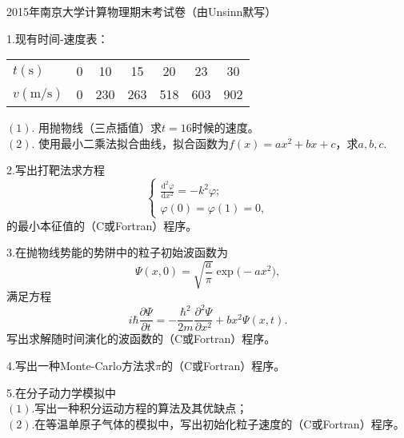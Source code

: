 \documentclass[10pt]{extarticle}
\begin{document}
\begin{center}
	2015年南京大学计算物理期末考试卷（由Unsinn默写）
\end{center}

\noindent 1.现有时间-速度表：

\begin{table}[h]
\centering
\begin{tabular}{l c c c c c c}
\hline
$t(\mathrm{s})$ & 0 & 10 & 15 &20 &23 &30\\
$v(\mathrm{m/s})$ & 0 & 230 & 263 & 518 &603 &902\\
\hline
\end{tabular}
\end{table}
\noindent $(1)$. 用抛物线（三点插值）求$t=16$时候的速度。\\
$(2)$. 使用最小二乘法拟合曲线，拟合函数为$f(x)=ax^2+bx+c$，求$a,b,c$.

\vspace{10ex}

\noindent 2.写出打靶法求方程
\[
	\begin{cases}
		\displaystyle{\frac{\mathrm{d}^2\varphi}{\mathrm{d}x^2}=-k^2 \varphi};\\
		\varphi(0)=\varphi(1)=0,
	\end{cases}
\]
的最小本征值的（C或Fortran）程序。

\vspace{10ex}

\noindent 3.在抛物线势能的势阱中的粒子初始波函数为
\[
	\Psi(x,0)=\sqrt{\frac{a}{\pi}}\exp\bigl(-ax^2\bigr),
\]
满足方程
\[
	i\hbar \frac{\partial \Psi}{\partial t}=-\frac{\hbar^2}{2m}\frac{\partial^2 \Psi}{\partial x^2}+b x^2\Psi(x,t).
\]
写出求解随时间演化的波函数的（C或Fortran）程序。

\vspace{10ex}

\noindent 4.写出一种Monte-Carlo方法求$\pi$的（C或Fortran）程序。

\vspace{10ex}

\noindent 5.在分子动力学模拟中\\
$(1)$.写出一种积分运动方程的算法及其优缺点；\\
$(2)$.在等温单原子气体的模拟中，写出初始化粒子速度的（C或Fortran）程序。
\end{document}
